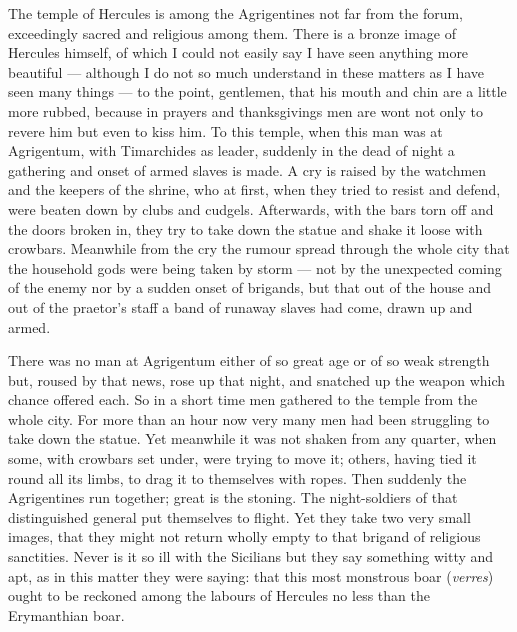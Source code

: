  The temple of Hercules is among the Agrigentines not far from the forum, exceedingly sacred and religious among them. There is a bronze image of Hercules himself, of which I could not easily say I have seen anything more beautiful --- although I do not so much understand in these matters as I have seen many things --- to the point, gentlemen, that his mouth and chin are a little more rubbed, because in prayers and thanksgivings men are wont not only to revere him but even to kiss him. To this temple, when this man was at Agrigentum, with Timarchides as leader, suddenly in the dead of night a gathering and onset of armed slaves is made. A cry is raised by the watchmen and the keepers of the shrine, who at first, when they tried to resist and defend, were beaten down by clubs and cudgels. Afterwards, with the bars torn off and the doors broken in, they try to take down the statue and shake it loose with crowbars. Meanwhile from the cry the rumour spread through the whole city that the household gods were being taken by storm --- not by the unexpected coming of the enemy nor by a sudden onset of brigands, but that out of the house and out of the praetor's staff a band of runaway slaves had come, drawn up and armed.

 There was no man at Agrigentum either of so great age or of so weak strength but, roused by that news, rose up that night, and snatched up the weapon which chance offered each. So in a short time men gathered to the temple from the whole city. For more than an hour now very many men had been struggling to take down the statue. Yet meanwhile it was not shaken from any quarter, when some, with crowbars set under, were trying to move it; others, having tied it round all its limbs, to drag it to themselves with ropes. Then suddenly the Agrigentines run together; great is the stoning. The night-soldiers of that distinguished general put themselves to flight. Yet they take two very small images, that they might not return wholly empty to that brigand of religious sanctities. Never is it so ill with the Sicilians but they say something witty and apt, as in this matter they were saying: that this most monstrous boar (\textit{verres}) ought to be reckoned among the labours of Hercules no less than the Erymanthian boar.


